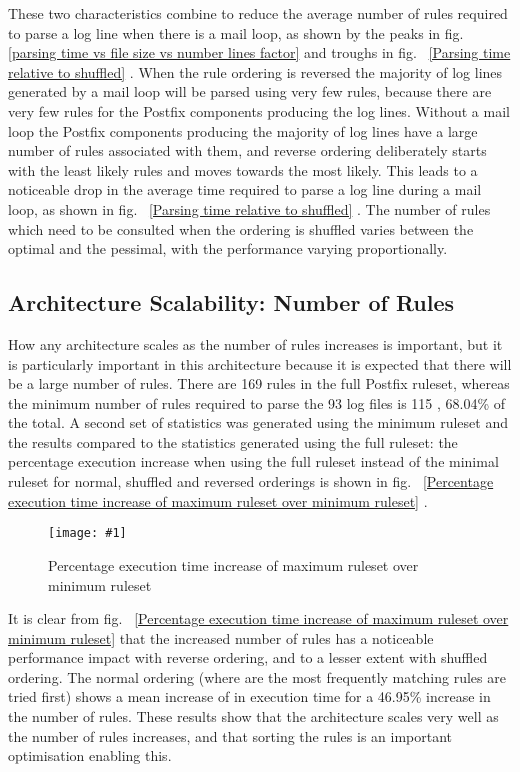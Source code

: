 \documentclass[draft]{svmult}
\newcommand{\showgraph}[3]{%
    \begin{figure}[hbt!]%
        \caption{#2}\label{#3}%
        \texttt{[image: \#1]}%
    \end{figure}%
}
\newcommand{\refwithpage}[1]{%
    \empty{}\vref{#1}%
}
\newcommand{\numberOFlogFILES}[0]{%
    93%
}
\newcommand{\numberOFrules}[0]{%
    169%
}
\newcommand{\numberOFrulesMINIMUM}[0]{%
    115%
}
\newcommand{\numberOFrulesMINIMUMpercentage}[0]{%
    68.04\%%
}
\newcommand{\numberOFrulesMAXIMUMpercentage}[0]{%
    46.95\%%
}
\begin{document}
These two characteristics combine to reduce the average number of rules
required to parse a log line when there is a mail loop, as shown by the
peaks in fig.~\refwithpage{parsing time vs file size vs number lines
factor} and troughs in fig.~\refwithpage{Parsing time relative to
shuffled}.  When the rule ordering is reversed the majority of log lines
generated by a mail loop will be parsed using very few rules, because there
are very few rules for the Postfix components producing the log lines.
Without a mail loop the Postfix components producing the majority of log
lines have a large number of rules associated with them, and reverse
ordering deliberately starts with the least likely rules and moves towards
the most likely.  This leads to a noticeable drop in the average time
required to parse a log line during a mail loop, as shown in
fig.~\refwithpage{Parsing time relative to shuffled}.  The number of rules
which need to be consulted when the ordering is shuffled varies between the
optimal and the pessimal, with the performance varying proportionally.

\subsection{Architecture Scalability: Number of Rules}

How any architecture scales as the number of rules increases is important,
but it is particularly important in this architecture because it is
expected that there will be a large number of rules.  There are
\numberOFrules{} rules in the full Postfix ruleset, whereas the minimum
number of rules required to parse the \numberOFlogFILES{} log files is
\numberOFrulesMINIMUM{}, \numberOFrulesMINIMUMpercentage{} of the total.  A
second set of statistics was generated using the minimum ruleset and the
results compared to the statistics generated using the full ruleset: the
percentage execution increase when using the full ruleset instead of the
minimal ruleset for normal, shuffled and reversed orderings is shown in
fig.~\refwithpage{Percentage execution time increase of maximum ruleset
over minimum ruleset}.  \showgraph{build/plot-normal-vs-smaller}{Percentage
execution time increase of maximum ruleset over minimum ruleset}{Percentage
execution time increase of maximum ruleset over minimum ruleset}

It is clear from fig.~\refwithpage{Percentage execution time increase of
maximum ruleset over minimum ruleset} that the increased number of rules
has a noticeable performance impact with reverse ordering, and to a lesser
extent with shuffled ordering.  The normal ordering (where are the most
frequently matching rules are tried first) shows a mean increase of 
 in
execution time for a \numberOFrulesMAXIMUMpercentage{} increase in the
number of rules.  These results show that the architecture scales very well
as the number of rules increases, and that sorting the rules is an
important optimisation enabling this.
\end{document}
